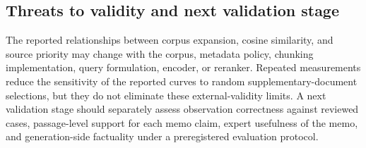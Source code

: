\subsection{Threats to validity and next validation stage}
The reported relationships between corpus expansion, cosine similarity, and source priority may change with the corpus, metadata policy, chunking implementation, query formulation, encoder, or reranker. Repeated measurements reduce the sensitivity of the reported curves to random supplementary-document selections, but they do not eliminate these external-validity limits. A next validation stage should separately assess observation correctness against reviewed cases, passage-level support for each memo claim, expert usefulness of the memo, and generation-side factuality under a preregistered evaluation protocol.
